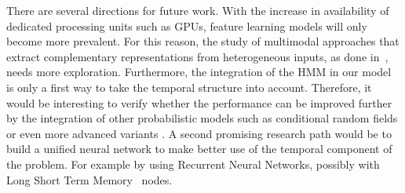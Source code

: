 There are several directions for future work. With the increase in availability of dedicated processing units such as GPUs, feature learning models will only become more prevalent. For this reason, the study of multimodal approaches that extract complementary representations from heterogeneous inputs, as done in~\cite{neverova2014moddrop}, needs more exploration.
Furthermore, the integration of the HMM in our model is only a first way to take the temporal structure into account. Therefore, it would be interesting to verify whether the performance can be improved further by the integration of other probabilistic models such as conditional random fields or even more advanced variants \cite{wang2006hidden}. A second promising research path would be to build a unified neural network to make better use of the temporal component of the problem. For example by using Recurrent Neural Networks, possibly with Long Short Term Memory~\cite{graves2009novel} nodes.



\endinput

